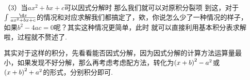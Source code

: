 {（3）当$ax^2+bx+c$可以因式分解时
那么我们就可以对原积分裂项
到这，对于$\int{\frac{\d x}{ax^2+bx+c}}$的情况和对应求解我们都搞定了，欸，你说怎么少了一种情况的样子，如果$b^2-4ac=0$呢？其实这种情况更简单，此时
就可以直接利用基本积分表求解啦，过程就不赘述了.

其实对于这样的积分，先看看能否因式分解，因为因式分解的计算方法运算量最小，如果发现不好分解，那么再考虑考虑配方法，转化为$\qty(x+b)^2-a^2$或$\qty(x+b)^2+a^2$的形式，分别积分即可.
}%